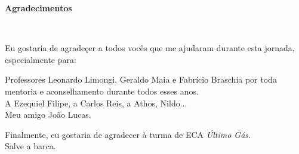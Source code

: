 \begin{center}
\textbf{Agradecimentos}
\end{center}

$\!$\\
\begin{flushright}
\parbox{0.65\linewidth}{
\itshape \flushright

Eu gostaria de agradeçer a todos vocês que me ajudaram durante esta jornada, especialmente para:
\vspace{0.5 in}

Professores Leonardo Limongi, Geraldo Maia e Fabrício Braschia por toda mentoria e aconselhamento durante todos esses anos.\\
\vspace{0.5cm}
A Ezequiel Filipe, a Carlos Reis, a Athos, Nildo...\\
\vspace{0.5cm}
Meu amigo João Lucas.\\

\vspace{2cm}

Finalmente, eu gostaria de agradecer à turma de ECA \textit{Último Gás}.\\
\vspace{0.5cm}
Salve a barca.
}
\end{flushright}
